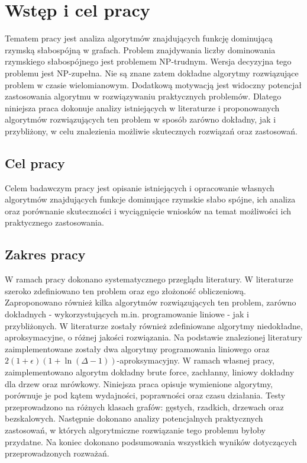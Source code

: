 \chapter{Wstęp i cel pracy}
Tematem pracy jest analiza algorytmów znajdujących funkcję dominującą rzymską słabospójną w grafach.
Problem znajdywania liczby dominowania rzymskiego słabospójnego jest problemem NP-trudnym. Wersja decyzyjna tego problemu jest NP-zupełna. Nie są znane zatem dokładne algorytmy rozwiązujące problem w czasie wielomianowym. Dodatkową motywacją jest widoczny potencjał zastosowania algorytmu w rozwiązywaniu praktycznych problemów. Dlatego niniejsza praca dokonuje analizy istniejących w literaturze i proponowanych algorytmów rozwiązujących ten problem w sposób zarówno dokładny, jak i przybliżony, w celu znalezienia możliwie skutecznych rozwiązań oraz zastosowań.

\section{Cel pracy}
Celem badawczym pracy jest opisanie istniejących i opracowanie własnych algorytmów znajdujących funkcje dominujące rzymskie słabo spójne, ich analiza oraz porównanie skuteczności i wyciągnięcie wniosków na temat możliwości ich praktycznego zastosowania.

\section{Zakres pracy}
W ramach pracy dokonano systematycznego przeglądu literatury. W literaturze szeroko zdefiniowano ten problem oraz ego złożoność obliczeniową. Zaproponowano również kilka algorytmów rozwiązujących ten problem, zarówno dokładnych - wykorzystujących m.in. programowanie liniowe - jak i przybliżonych. W literaturze zostały również zdefiniowane algorytmy niedokładne, aproksymacyjne, o różnej jakości rozwiązania. Na podstawie znalezionej literatury zaimplementowane zostały dwa algorytmy programowania liniowego oraz $2(1+\epsilon)(1 + \ln(\Delta - 1))$-aproksymacyjny. W ramach własnej pracy, zaimplementowano algorytm dokładny brute force, zachłanny, liniowy dokładny dla drzew oraz mrówkowy. Niniejsza praca opisuje wymienione algorytmy, porównuje je pod kątem wydajności, poprawności oraz czasu działania. Testy przeprowadzono na różnych klasach grafów: gęstych, rzadkich, drzewach oraz bezskalowych. Następnie dokonano analizy potencjalnych praktycznych zastosowań, w których algorytmiczne rozwiązanie tego problemu byłoby przydatne. Na koniec dokonano podsumowania wszystkich wyników dotyczących przeprowadzonych rozważań.